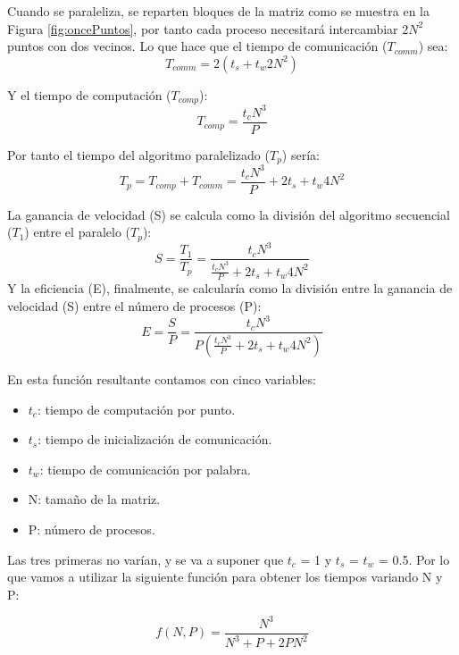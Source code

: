 \documentclass[10pt,twocolumn,a4paper]{article}
\begin{document}
Cuando se paraleliza, se reparten bloques de la matriz como se muestra en la Figura \ref{fig:oncePuntos}, por tanto cada proceso necesitará intercambiar $2N^{2}$ puntos con dos vecinos. Lo que hace que el tiempo de comunicación ($T_{comm}$) sea:
\begin{equation}
	T_{comm} = 2(t_{s} + t_{w}2N^{2})
\end{equation}

Y el tiempo de computación ($T_{comp}$):
\begin{equation}
	T_{comp} = \frac{t_{c}N^{3}}{P} 
\end{equation}

Por tanto el tiempo del algoritmo paralelizado ($T_{p}$) sería:
\begin{equation}
	T_{p} = T_{comp} + T_{comm} = \frac{t_{c}N^{3}}{P} + 2t_{s} + t_{w}4N^{2}
\end{equation}

La ganancia de velocidad (S) se calcula como la división del algoritmo secuencial ($T_{1}$) entre el paralelo ($T_{p}$):
\begin{equation}
	S = \frac{T_{1}}{T_{p}} = \frac{t_{c}N^{3}}{\frac{t_{c}N^{3}}{P} + 2t_{s} + t_{w}4N^{2}}
\end{equation}
Y la eficiencia (E), finalmente, se calcularía como la división entre la ganancia de velocidad (S) entre el número de procesos (P):
\begin{equation}
	E = \frac{S}{P} = \frac{t_{c}N^{3}}{P( \frac{t_{c}N^{3}}{P} + 2t_{s} + t_{w}4N^{2})}
\end{equation}

En esta función resultante contamos con cinco variables:
\begin{itemize}
	\item $t_{c}$: tiempo de computación por punto.
	\item $t_{s}$: tiempo de inicialización de comunicación.
	\item $t_{w}$: tiempo de comunicación por palabra.
	\item N: tamaño de la matriz.
	\item P: número de procesos.
\end{itemize}

Las tres primeras no varían, y se va a suponer que $t_{c}$ = 1 y $t_{s}$ = $t_{w}$ = 0.5. Por lo que vamos a utilizar la siguiente función para obtener los tiempos variando N y P:

\begin{equation}
	f(N,P) = \frac{N^{3}}{N^{3} + P + 2PN^{2}}
\end{equation}
\end{document}
